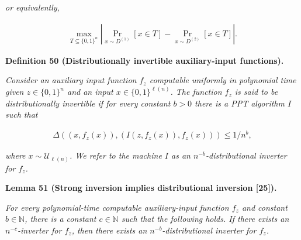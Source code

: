 \emph{or equivalently,}\par


\[\begin{gathered}
\mathop{\max}_{T\subseteq\{0,1\}^{n}}\left|\Pr_{x\sim D^{(1)}}[x\in T]-\Pr_{x\sim D^{(2)}}[x\in T]\right|.
\end{gathered}\]







\par\medskip\noindent\textbf{
\textbf{Definition 50}\textbf{ }(Distributionally invertible auxiliary-input functions)\textbf{.}
}\par



\emph{Consider an auxiliary input function $f_{z}$ computable uniformly in polynomial time given $z\in\{0,1\}^{n}$ and an input $x\in\{0,1\}^{\ell(n)}$. The function $f_{z}$ is said to be distributionally invertible if for every constant $b>0$ there is a PPT algorithm $I$ such that}\par


\[\begin{gathered}
\Delta((x,f_{z}(x)),(I(z,f_{z}(x)),f_{z}(x)))\leq 1/n^{b},
\end{gathered}\]


\emph{where $x\sim\mathcal{U}_{\ell(n)}$. We refer to the machine $I$ as an $n^{-b}$-distributional inverter for $f_{z}$.}\par







\par\medskip\noindent\textbf{
\textbf{Lemma 51}\textbf{ }(Strong inversion implies distributional inversion [25])\textbf{.}
}\par



\emph{For every polynomial-time computable auxiliary-input function $f_{z}$ and constant $b\in\mathbb{N}$, there is a constant $c\in\mathbb{N}$ such that the following holds. If there exists an $n^{-c}$-inverter for $f_{z}$, then there exists an $n^{-b}$-distributional inverter for $f_{z}$.}\par








